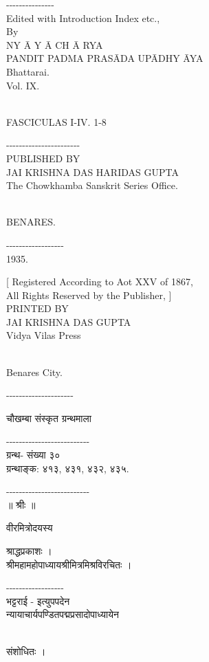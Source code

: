 \documentclass[11pt, openany]{book}
\begin{document}
{{{{{ -\/-\/-\/-\/-\/-\/-\/-\/-\/-\/-\/-\/-\/-\/-\\
Edited with Introduction Index etc.,\\
By\\
NY}{ Ā}{ Y}{ Ā}{ CH }{ Ā}{ RYA\\
PANDIT PADMA PRASĀDA }{UP}{Ā}{DHY ĀYA}{\\
Bhattarai.\\
Vol. IX.}{\\
FASCICULAS I-IV. 1-8

{ -\/-\/-\/-\/-\/-\/-\/-\/-\/-\/-\/-\/-\/-\/-\/-\/-\/-\/-\/-\/-\/-\/-\\
PUBLISHED BY\\
JAI KRISHNA DAS HARIDAS GUPTA\\
}{The Chowkhamba Sanskrit Series Office.}{\\
BENARES.

{ -\/-\/-\/-\/-\/-\/-\/-\/-\/-\/-\/-\/-\/-\/-\/-\/-\/-\\
1935.

{ {[} Registered According to Aot XXV of 1867,\\
All Rights Reserved by the Publisher, {]}\\


{ PRINTED BY\\
JAI KRISHNA DAS GUPTA\\
}{ Vidya Vilas Press}{\\
Benares City.

 

{ -\/-\/-\/-\/-\/-\/-\/-\/-\/-\/-\/-\/-\/-\/-\/-\/-\/-\/-\/-\/-}

  चौखम्बा संस्कृत ग्रन्थमाला


-\/-\/-\/-\/-\/-\/-\/-\/-\/-\/-\/-\/-\/-\/-\/-\/-\/-\/-\/-\/-\/-\/-\/-\/-\/-\\
ग्रन्थ- संख्या ३०\\
ग्रन्थाङ्क: ४१३, ४३१, ४३२, ४३५.


-\/-\/-\/-\/-\/-\/-\/-\/-\/-\/-\/-\/-\/-\/-\/-\/-\/-\/-\/-\/-\/-\/-\/-\/-\/-\\
॥ श्रीः ॥\\
}{ वीरमित्रोदयस्य}{\\
}{ श्राद्धप्रकाशः ।\\
श्रीमहामहोपाध्यायश्रीमित्रमिश्रविरचितः ।

{ -\/-\/-\/-\/-\/-\/-\/-\/-\/-\/-\/-\/-\/-\/-\/-\/-\/-\\
भट्टराई - इत्युपपदेन\\
}{न्यायाचार्यपण्डितपद्मप्रसादोपाध्यायेन}{\\
संशोधितः ।


}}}}}}}}}}
\end{document}

